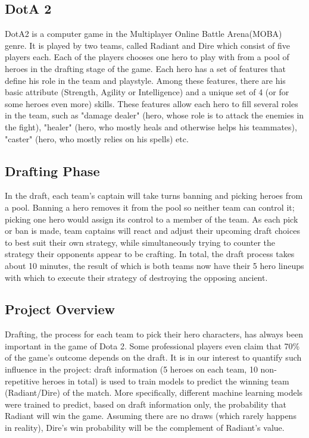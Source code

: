 \documentclass{article}
\begin{document}
\subsection{DotA 2\cite{Kaggle}}
DotA2 is a computer game in the Multiplayer Online Battle Arena(MOBA) genre. It is played by two teams, called Radiant and Dire which consist of five players each. Each of the players chooses one hero to play with from a pool of heroes in the drafting stage of the game. Each hero has a set of features that define his role in the team and playstyle. Among these features, there are his basic attribute (Strength, Agility or Intelligence) and a unique set of 4 (or for some heroes even more) skills. These features allow each hero to fill several roles in the team, such as "damage dealer" (hero, whose role is to attack the enemies in the fight), "healer" (hero, who mostly heals and otherwise helps his teammates), "caster" (hero, who mostly relies on his spells) etc. 


\subsection{Drafting Phase\cite{grutzik2017predicting}}
In the draft, each team’s captain will take turns banning and picking heroes from a pool. Banning a hero removes it from the pool so neither team can control it; picking one hero would assign its control to a member of the team. As each pick or ban is made, team captains will react and adjust their upcoming draft choices to best suit their own strategy, while simultaneously trying to counter the strategy their opponents appear to be crafting. In total, the draft process takes about 10 minutes, the result of which is both teams now have their 5 hero lineups with which to execute their strategy of destroying the opposing ancient.

\subsection{Project Overview}
Drafting, the process for each team to pick their hero characters, has always been important in the game of Dota 2. Some professional players even claim that 70\% of the game’s outcome depends on the draft. It is in our interest to quantify such influence in the project: draft information (5 heroes on each team, 10 non-repetitive heroes in total) is used to train models to predict the winning team (Radiant/Dire) of the match. More specifically, different machine learning models were trained to predict, based on draft information only, the probability that Radiant will win the game. Assuming there are no draws (which rarely happens in reality), Dire’s win probability will be the complement of Radiant’s value.
\end{document}
